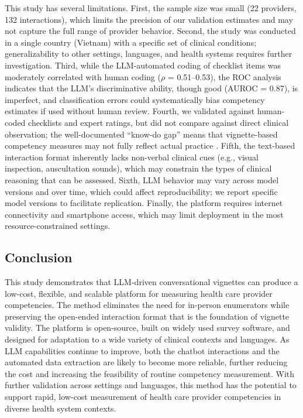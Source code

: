 \documentclass{article}
\begin{document}
This study has several limitations. First, the sample size was small (22 providers, 132 interactions), which limits the precision of our validation estimates and may not capture the full range of provider behavior. Second, the study was conducted in a single country (Vietnam) with a specific set of clinical conditions; generalizability to other settings, languages, and health systems requires further investigation. Third, while the LLM-automated coding of checklist items was moderately correlated with human coding ($\rho$ = 0.51--0.53), the ROC analysis indicates that the LLM's discriminative ability, though good (AUROC = 0.87), is imperfect, and classification errors could systematically bias competency estimates if used without human review. Fourth, we validated against human-coded checklists and expert ratings, but did not compare against direct clinical observation; the well-documented ``know-do gap'' means that vignette-based competency measures may not fully reflect actual practice \citep{ibnat2019three}. Fifth, the text-based interaction format inherently lacks non-verbal clinical cues (e.g., visual inspection, auscultation sounds), which may constrain the types of clinical reasoning that can be assessed. Sixth, LLM behavior may vary across model versions and over time, which could affect reproducibility; we report specific model versions to facilitate replication. Finally, the platform requires internet connectivity and smartphone access, which may limit deployment in the most resource-constrained settings.

\subsection{Conclusion}

This study demonstrates that LLM-driven conversational vignettes can produce a low-cost, flexible, and scalable platform for measuring health care provider competencies. The method eliminates the need for in-person enumerators while preserving the open-ended interaction format that is the foundation of vignette validity. The platform is open-source, built on widely used survey software, and designed for adaptation to a wide variety of clinical contexts and languages. As LLM capabilities continue to improve, both the chatbot interactions and the automated data extraction are likely to become more reliable, further reducing the cost and increasing the feasibility of routine competency measurement. With further validation across settings and languages, this method has the potential to support rapid, low-cost measurement of health care provider competencies in diverse health system contexts.
\end{document}

